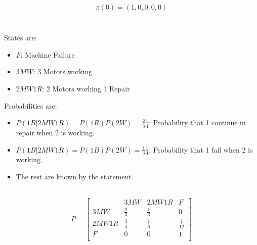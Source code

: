 \documentclass[12pt, a4paper]{article}
\begin{document}
\begin{subequations}
  \begin{align}
    \pi(0) = (1, 0, 0, 0, 0)
  \end{align}
\end{subequations}

\section{}
\subsection{}

States are:
\begin{itemize}
  \item $F$: Machine Failure
  \item $3MW$: 3 Motors working
  \item $2MW1R$: 2 Motors working 1 Repair
\end{itemize}

Probabilities are:
\begin{itemize}
  \item $P(1R | 2MW1R) = P(1R)P(2W) = \frac{2}{3}\frac{1}{4}$: Probability that 1 continue in repair when 2 is working.
  \item $P(1B | 2MW1R) = P(1B)P(2W) = \frac{1}{3}\frac{1}{4}$: Probability that 1 fail when 2 is working.
  \item The rest are known by the statement.
\end{itemize}


\subsection{}
\begin{align*}
  P = \begin{bmatrix}
        & 3MW & 2MW1R & F\\
    3MW & \frac{2}{3} & \frac{1}{3} & 0\\
    2MW1R & \frac{3}{4} & \frac{1}{6} & \frac{1}{12}\\
    F   & 0 & 0 & 1\\
  \end{bmatrix}
\end{align*}
\end{document}
